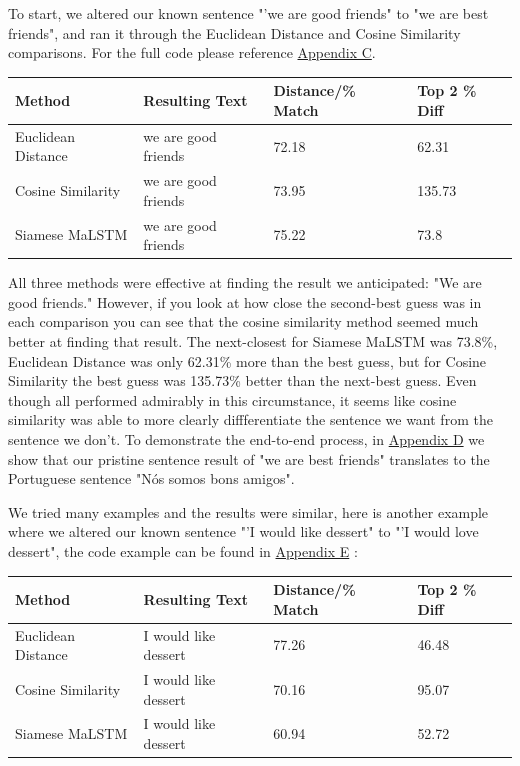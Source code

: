 \documentclass[runningheads]{llncs}
\begin{document}
	To start, we altered our known sentence "'we are good friends" to "we are best friends", and ran it through the Euclidean Distance and Cosine Similarity comparisons. For the full code please reference \hyperlink{Appendix C}{Appendix C}.

\vspace{10 mm}
	\begin{minipage}{\linewidth}
			\begin{tabular}{| l | l | l | l |}
			  \hline			
			  Method & Resulting Text & Distance/\% Match & Top 2 \% Diff \\
			  \hline			
			  Euclidean Distance & we are good friends & 72.18 & 62.31 \\
			  \hline			
			  Cosine Similarity & we are good friends & 73.95 & 135.73 \\
			  \hline  
			  Siamese MaLSTM & we are good friends & 75.22 & 73.8 \\
			  \hline
			\end{tabular}
	\end{minipage}
	\afterpage{\clearpage}
\vspace{10 mm}

	All three methods were effective at finding the result we anticipated: "We are good friends." However, if you look at how close the second-best guess was in each comparison you can see that the cosine similarity method seemed much better at finding that result. The next-closest for Siamese MaLSTM was 73.8\%, Euclidean Distance was only 62.31\% more than the best guess, but for Cosine Similarity the best guess was 135.73\% better than the next-best guess. Even though all performed admirably in this circumstance, it seems like cosine similarity was able to more clearly diffferentiate the sentence we want from the sentence we don't.  To demonstrate the end-to-end process, in \hyperlink{Appendix D}{Appendix D} we show that our pristine sentence result of "we are best friends" translates to the Portuguese sentence "Nós somos bons amigos".

	We tried many examples and the results were similar, here is another example where we altered our known sentence "'I would like dessert" to "'I would love dessert", the code example can be found in \hyperlink{Appendix E}{Appendix E} :


\vspace{10 mm}
	\begin{minipage}{\linewidth}
			\begin{tabular}{| l | l | l | l |}
			  \hline			
			  Method & Resulting Text & Distance/\% Match & Top 2 \% Diff \\
			  \hline			
			  Euclidean Distance & I would like dessert & 77.26 & 46.48 \\
			  \hline			
			  Cosine Similarity & I would like dessert & 70.16 & 95.07 \\
			  \hline  
			  Siamese MaLSTM & I would like dessert & 60.94 & 52.72 \\
			  \hline
			\end{tabular}
	\end{minipage}
	\afterpage{\clearpage}
\vspace{10 mm}
\end{document}
